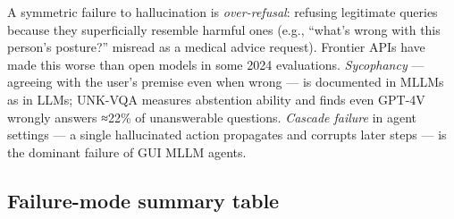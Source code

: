\documentclass{article}
\begin{document}
A symmetric failure to hallucination is \emph{over-refusal}: refusing legitimate queries because they superficially resemble harmful ones (e.g., ``what's wrong with this person's posture?'' misread as a medical advice request). Frontier APIs have made this worse than open models in some 2024 evaluations. \emph{Sycophancy} --- agreeing with the user's premise even when wrong --- is documented in MLLMs as in LLMs; UNK-VQA \citep{guo20242024} measures abstention ability and finds even GPT-4V wrongly answers ≈22\% of unanswerable questions. \emph{Cascade failure} in agent settings --- a single hallucinated action propagates and corrupts later steps --- is the dominant failure of GUI MLLM agents.

\subsection{Failure-mode summary table}\label{failure-mode-summary-table}
\end{document}
